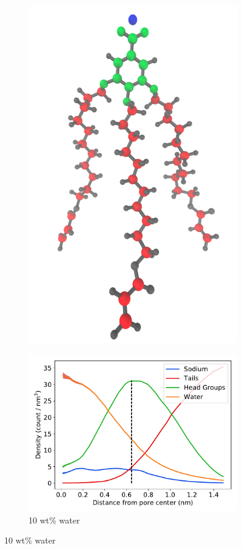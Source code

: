 \documentclass{article}
\begin{document}
\begin{figure}[!htb]
\begin{subfigure}{0.15\textwidth}
  \includegraphics[width=\textwidth]{monomer_color_coded.pdf}
  \label{fig:monomer_color_coded}
  \end{subfigure}
  \begin{subfigure}{0.415\textwidth}
  \includegraphics[width=\textwidth]{component_density_10wt.pdf}
  \caption{10 wt\% water}\label{fig:component_density_10wt}
  \end{subfigure}


\end{figure}
\end{document}
